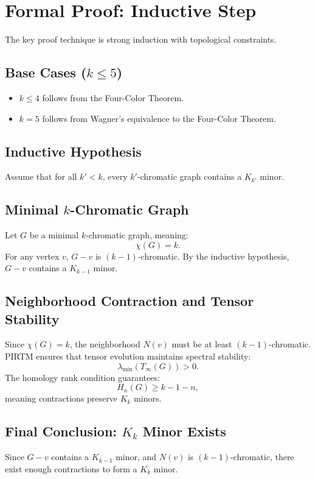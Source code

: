 \documentclass[11pt]{article}
\theoremstyle{plain}
\begin{document}
\section{Formal Proof: Inductive Step}

The key proof technique is strong induction with topological constraints.

\subsection{Base Cases ($k \leq 5$)}
\begin{itemize}
    \item $k \leq 4$ follows from the Four-Color Theorem.
    \item $k = 5$ follows from Wagner’s equivalence to the Four-Color Theorem.
\end{itemize}

\subsection{Inductive Hypothesis}
Assume that for all $k' < k$, every $k'$-chromatic graph contains a $K_{k'}$ minor.

\subsection{Minimal $k$-Chromatic Graph}
Let $G$ be a minimal $k$-chromatic graph, meaning:
\begin{equation}
    \chi(G) = k.
\end{equation}
For any vertex $v$, $G - v$ is $(k-1)$-chromatic.
By the inductive hypothesis, $G - v$ contains a $K_{k-1}$ minor.

\subsection{Neighborhood Contraction and Tensor Stability}
Since $\chi(G) = k$, the neighborhood $N(v)$ must be at least $(k-1)$-chromatic.
PIRTM ensures that tensor evolution maintains spectral stability:
\begin{equation}
    \lambda_{\min}(T_\infty(G)) > 0.
\end{equation}
The homology rank condition guarantees:
\begin{equation}
    H_n(G) \geq k - 1 - n,
\end{equation}
meaning contractions preserve $K_k$ minors.

\subsection{Final Conclusion: $K_k$ Minor Exists}
Since $G - v$ contains a $K_{k-1}$ minor, and $N(v)$ is $(k-1)$-chromatic, there exist enough contractions to form a $K_k$ minor.
\end{document}
